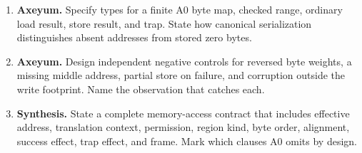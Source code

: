 \begin{enumerate}
object's lifetime.
\item \textbf{Axeyum.} Specify types for a finite A0 byte map, checked range,
ordinary load result, store result, and trap. State how canonical
serialization distinguishes absent addresses from stored zero bytes.
\item \textbf{Axeyum.} Design independent negative controls for reversed byte
weights, a missing middle address, partial store on failure, and corruption
outside the write footprint. Name the observation that catches each.
\item \textbf{Synthesis.} State a complete memory-access contract that includes
effective address, translation context, permission, region kind, byte order,
alignment, success effect, trap effect, and frame. Mark which clauses A0 omits
by design.
\end{enumerate}
